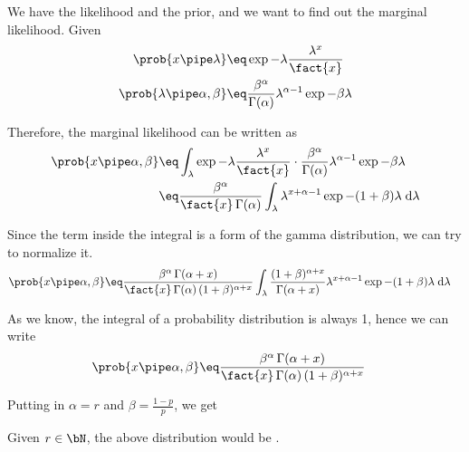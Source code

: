 \documentclass{article}
\begin{document}
\begin{question}

	We have the likelihood and the prior, and we want to find out the marginal likelihood.
	Given
	\begin{align*}
		\prob{x \pipe \lambda}				&\eq	\exp{-\lambda} \frac{\lambda^x}{\fact{x}} \\
		\prob{\lambda \pipe \alpha, \beta}	&\eq	\frac{\beta^\alpha}{\Gamma(\alpha)} \lambda^{\alpha - 1} \exp{- \beta \lambda}
	\end{align*}

	Therefore, the marginal likelihood can be written as
	\begin{align*}
		\prob{x \pipe \alpha, \beta}		&\eq	\int_{\lambda} \exp{-\lambda} \frac{\lambda^x}{\fact{x}} \cdot \frac{\beta^\alpha}{\Gamma(\alpha)} \lambda^{\alpha - 1} \exp{- \beta \lambda} \\
		&\eq	\frac{\beta^\alpha}{\fact{x} \, \Gamma(\alpha)} \int_{\lambda} \lambda^{x + \alpha - 1} \exp{-(1 + \beta) \lambda} \;\text{d}\lambda
	\end{align*}

	Since the term inside the integral is a form of the gamma distribution, we can try to normalize it.
	\begin{align*}
		\prob{x \pipe \alpha, \beta}	&\eq	\frac{\beta^\alpha \, \Gamma(\alpha + x)}{\fact{x} \, \Gamma(\alpha) \, (1 + \beta)^{\alpha + x}} \int_{\lambda} \frac{(1 + \beta)^{\alpha + x}}{\Gamma(\alpha + x)} \lambda^{x + \alpha - 1} \exp{-(1 + \beta) \lambda} \;\text{d}\lambda
	\end{align*}

	As we know, the integral of a probability distribution is always 1, hence we can write
	\begin{align*}
		\prob{x \pipe \alpha, \beta}	&\eq	\frac{\beta^{\alpha} \, \Gamma(\alpha + x)}{\fact{x} \, \Gamma(\alpha) \, (1 + \beta)^{\alpha + x}}
	\end{align*}

	Putting in $\alpha = r$ and $\beta = \frac{1 - p}{p}$, we get

	Given $r \in \bN$, the above distribution would be .

\end{question}
\end{document}
